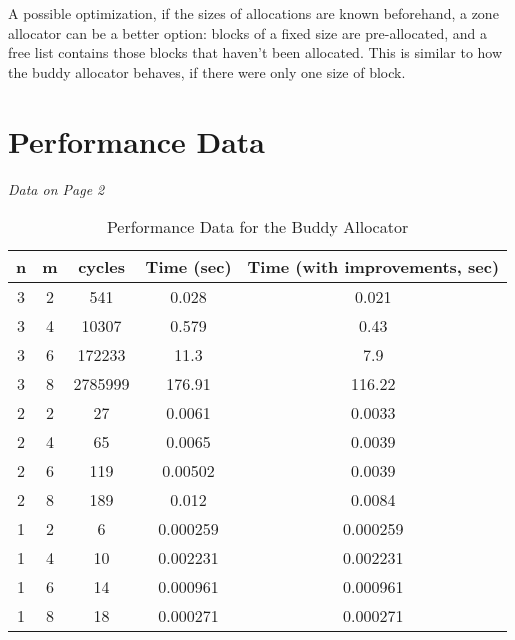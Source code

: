 \documentclass[10pt]{article}
\begin{document}
A possible optimization, if the sizes of allocations are known beforehand, a zone allocator can be a better option: blocks of a fixed size are pre-allocated, and a free list contains those blocks that haven't been allocated. This is similar to how the buddy allocator behaves, if there were only one size of block.

\section{Performance Data}
{
\center\it
{Data on Page 2}
}

\pagebreak

\begin{table}[]
\begin{tabular}{c|c|c|c|c}
\textbf{n} & \textbf{m} & \textbf{cycles} & \textbf{Time (sec)} & \textbf{Time (with improvements, sec)} \\ \hline
3 & 2 & 541 & 0.028 & 0.021 \\
3 & 4 & 10307 & 0.579 & 0.43 \\
3 & 6 & 172233 & 11.3 & 7.9 \\
3 & 8 & 2785999 & 176.91 & 116.22 \\
2 & 2 & 27 & 0.0061 & 0.0033 \\
2 & 4 & 65 & 0.0065 & 0.0039 \\
2 & 6 & 119 & 0.00502 & 0.0039 \\
2 & 8 & 189 & 0.012 & 0.0084 \\
1 & 2 & 6 & 0.000259 & 0.000259 \\
1 & 4 & 10 & 0.002231 & 0.002231 \\
1 & 6 & 14 & 0.000961 & 0.000961 \\
1 & 8 & 18 & 0.000271 & 0.000271
\end{tabular}
\caption{Performance Data for the Buddy Allocator}
\end{table}
\end{document}
